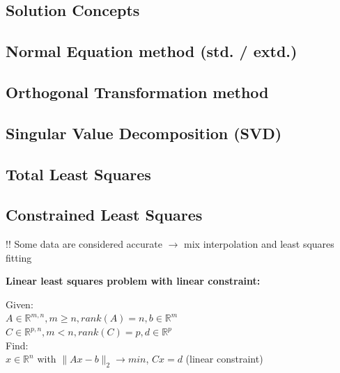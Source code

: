 \documentclass[12pt, a4paper]{article}
\newcommand{\R}{\mathbb{R}}
\begin{document}
\subsection{Solution Concepts}

\subsection{Normal Equation method (std. / extd.)}

\subsection{Orthogonal Transformation method}
 
\subsection{Singular Value Decomposition (SVD)}

\subsection{Total Least Squares}

\subsection{Constrained Least Squares}

!! Some data are considered accurate $\rightarrow$ mix interpolation and least squares fitting

\begin{tcolorbox}
\textbf{Linear least squares problem with linear constraint:}

Given: \\
$A \in \R^{m,n}, m \geq n, rank(A) = n, b \in \R^{m}$\\
 $C \in \R^{p,n}, m < n, rank(C) = p, d \in \R^{p}$ \\

Find: \\
$x \in \R^{n}$ with $ \lVert Ax - b\rVert_{2} \rightarrow min $, \quad \quad $Cx =d$ (linear constraint)	
\end{tcolorbox}




 
\end{document}
